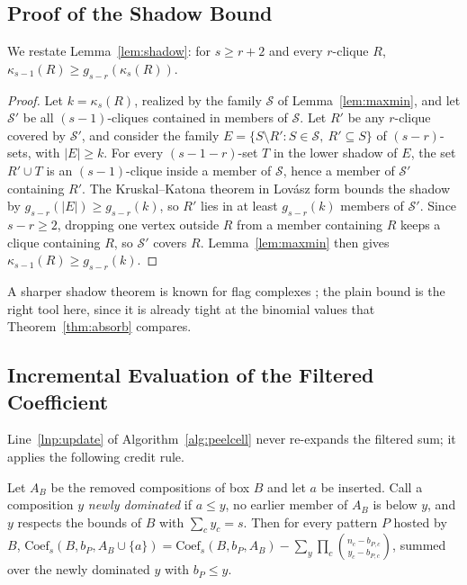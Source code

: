 \subsection{Proof of the Shadow Bound}\label{app:shadow}
We restate Lemma~\ref{lem:shadow}: for $s\ge r+2$ and every $r$-clique $R$, $\kappa_{s-1}(R)\ge g_{s-r}(\kappa_s(R))$.

\begin{proof}
Let $k=\kappa_s(R)$, realized by the family $\mathcal{S}$ of Lemma~\ref{lem:maxmin}, and let $\mathcal{S}'$ be all $(s{-}1)$-cliques contained in members of $\mathcal{S}$.
%
Let $R'$ be any $r$-clique covered by $\mathcal{S}'$, and consider the family $E=\{S\setminus R': S\in\mathcal{S},\ R'\subseteq S\}$ of $(s{-}r)$-sets, with $|E|\ge k$.
%
For every $(s{-}1{-}r)$-set $T$ in the lower shadow of $E$, the set $R'\cup T$ is an $(s{-}1)$-clique inside a member of $\mathcal{S}$, hence a member of $\mathcal{S}'$ containing $R'$.
%
The Kruskal--Katona theorem in Lov\'asz form \cite{kruskal1963,katona1968,lovasz1979} bounds the shadow by $g_{s-r}(|E|)\ge g_{s-r}(k)$, so $R'$ lies in at least $g_{s-r}(k)$ members of $\mathcal{S}'$.
%
Since $s-r\ge2$, dropping one vertex outside $R$ from a member containing $R$ keeps a clique containing $R$, so $\mathcal{S}'$ covers $R$.
%
Lemma~\ref{lem:maxmin} then gives $\kappa_{s-1}(R)\ge g_{s-r}(k)$.
\end{proof}

A sharper shadow theorem is known for flag complexes \cite{frohmader2008}; the plain bound is the right tool here, since it is already tight at the binomial values that Theorem~\ref{thm:absorb} compares.


\subsection{Incremental Evaluation of the Filtered Coefficient}\label{app:delta}
Line~\ref{lnp:update} of Algorithm~\ref{alg:peelcell} never re-expands the filtered sum; it applies the following credit rule.

\begin{lemma}\label{lem:credit}
Let $A_B$ be the removed compositions of box $B$ and let $a$ be inserted.
%
Call a composition $y$ \emph{newly dominated} if $a\le y$, no earlier member of $A_B$ is below $y$, and $y$ respects the bounds of $B$ with $\sum_c y_c=s$.
%
Then for every pattern $P$ hosted by $B$,
$\mathrm{Coef}_s(B,b_P,A_B\cup\{a\})=\mathrm{Coef}_s(B,b_P,A_B)-\sum_{y}\prod_{c}\binom{n_c-b_{P,c}}{y_c-b_{P,c}}$,
summed over the newly dominated $y$ with $b_P\le y$.
\end{lemma}

